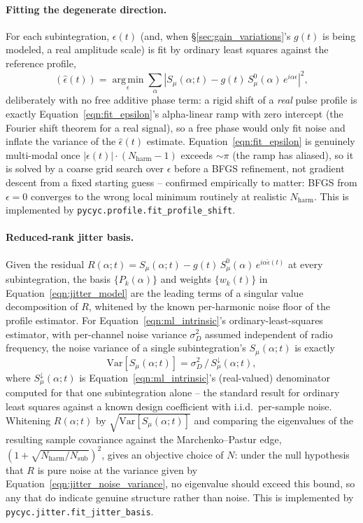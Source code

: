 \documentclass[manuscript]{aastex631}
\newcommand{\Nsub}{\ensuremath{N_\mathrm{sub}}}
\newcommand{\Nharm}{\ensuremath{N_\mathrm{harm}}}
\newcommand{\Eqn}[1]{Equation~\ref{eqn:#1}}
\begin{document}
\paragraph{Fitting the degenerate direction.} For each subintegration,
$\epsilon(t)$ (and, when \S\ref{sec:gain_variations}'s $g(t)$ is being
modeled, a real amplitude scale) is fit by ordinary least squares against
the reference profile,
%
\begin{equation}
(\hat\epsilon(t)) = \operatorname*{arg\,min}_{\epsilon} \sum_\alpha \left| S_\mu(\alpha;t) - g(t)\,S_\mu^0(\alpha)\,e^{i\alpha\epsilon} \right|^2,
\label{eqn:fit_epsilon}
\end{equation}
%
deliberately with no free additive phase term: a rigid shift of a
\emph{real} pulse profile is exactly \Eqn{fit_epsilon}'s alpha-linear ramp
with zero intercept (the Fourier shift theorem for a real signal), so a
free phase would only fit noise and inflate the variance of the
$\hat\epsilon(t)$ estimate. \Eqn{fit_epsilon} is genuinely multi-modal once
$|\epsilon(t)|\cdot(\Nharm-1)$ exceeds $\sim\pi$ (the ramp has aliased), so
it is solved by a coarse grid search over $\epsilon$ before a BFGS
refinement, not gradient descent from a fixed starting guess -- confirmed
empirically to matter: BFGS from $\epsilon=0$ converges to the wrong local
minimum routinely at realistic $\Nharm$. This is implemented by
\texttt{pycyc.profile.fit\_profile\_shift}.

\paragraph{Reduced-rank jitter basis.} Given the residual
$R(\alpha;t) = S_\mu(\alpha;t) - g(t)\,S_\mu^0(\alpha)\,e^{i\alpha\hat\epsilon(t)}$
at every subintegration, the basis $\{P_k(\alpha)\}$ and weights
$\{w_k(t)\}$ in \Eqn{jitter_model} are the leading terms of a singular
value decomposition of $R$, whitened by the known per-harmonic noise floor
of the profile estimator. For \Eqn{ml_intrinsic}'s ordinary-least-squares
estimator, with per-channel noise variance $\sigma_D^2$ assumed independent
of radio frequency, the noise variance of a single subintegration's
$S_\mu(\alpha;t)$ is exactly
%
\begin{equation}
\mathrm{Var}\left[S_\mu(\alpha;t)\right] = \sigma_D^2 \, / \, S_\mu^{\downarrow}(\alpha;t),
\label{eqn:jitter_noise_variance}
\end{equation}
%
where $S_\mu^\downarrow(\alpha;t)$ is \Eqn{ml_intrinsic}'s (real-valued)
denominator computed for that one subintegration alone -- the standard
result for ordinary least squares against a known design coefficient with
i.i.d.\ per-sample noise. Whitening $R(\alpha;t)$ by
$\sqrt{\mathrm{Var}[S_\mu(\alpha;t)]}$ and comparing the eigenvalues of the
resulting sample covariance against the Marchenko--Pastur edge,
$(1+\sqrt{\Nharm/\Nsub})^2$, gives an objective choice of $N$: under the
null hypothesis that $R$ is pure noise at the variance given by
\Eqn{jitter_noise_variance}, no eigenvalue should exceed this bound, so
any that do indicate genuine structure rather than noise. This is
implemented by \texttt{pycyc.jitter.fit\_jitter\_basis}.
\end{document}
